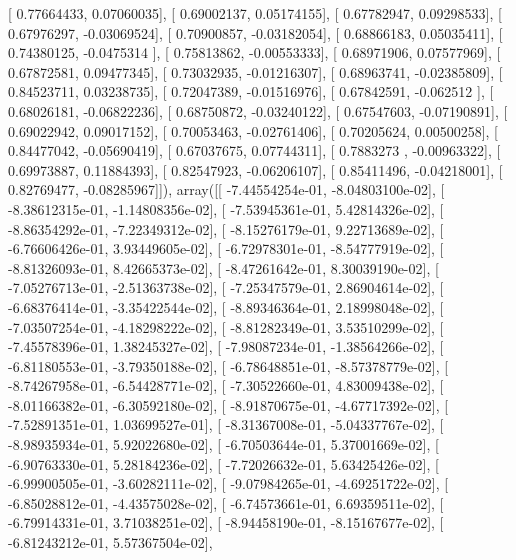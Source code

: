 \documentclass{article}
\begin{document}
       [ 0.77664433,  0.07060035],
       [ 0.69002137,  0.05174155],
       [ 0.67782947,  0.09298533],
       [ 0.67976297, -0.03069524],
       [ 0.70900857, -0.03182054],
       [ 0.68866183,  0.05035411],
       [ 0.74380125, -0.0475314 ],
       [ 0.75813862, -0.00553333],
       [ 0.68971906,  0.07577969],
       [ 0.67872581,  0.09477345],
       [ 0.73032935, -0.01216307],
       [ 0.68963741, -0.02385809],
       [ 0.84523711,  0.03238735],
       [ 0.72047389, -0.01516976],
       [ 0.67842591, -0.062512  ],
       [ 0.68026181, -0.06822236],
       [ 0.68750872, -0.03240122],
       [ 0.67547603, -0.07190891],
       [ 0.69022942,  0.09017152],
       [ 0.70053463, -0.02761406],
       [ 0.70205624,  0.00500258],
       [ 0.84477042, -0.05690419],
       [ 0.67037675,  0.07744311],
       [ 0.7883273 , -0.00963322],
       [ 0.69973887,  0.11884393],
       [ 0.82547923, -0.06206107],
       [ 0.85411496, -0.04218001],
       [ 0.82769477, -0.08285967]]), array([[ -7.44554254e-01,  -8.04803100e-02],
       [ -8.38612315e-01,  -1.14808356e-02],
       [ -7.53945361e-01,   5.42814326e-02],
       [ -8.86354292e-01,  -7.22349312e-02],
       [ -8.15276179e-01,   9.22713689e-02],
       [ -6.76606426e-01,   3.93449605e-02],
       [ -6.72978301e-01,  -8.54777919e-02],
       [ -8.81326093e-01,   8.42665373e-02],
       [ -8.47261642e-01,   8.30039190e-02],
       [ -7.05276713e-01,  -2.51363738e-02],
       [ -7.25347579e-01,   2.86904614e-02],
       [ -6.68376414e-01,  -3.35422544e-02],
       [ -8.89346364e-01,   2.18998048e-02],
       [ -7.03507254e-01,  -4.18298222e-02],
       [ -8.81282349e-01,   3.53510299e-02],
       [ -7.45578396e-01,   1.38245327e-02],
       [ -7.98087234e-01,  -1.38564266e-02],
       [ -6.81180553e-01,  -3.79350188e-02],
       [ -6.78648851e-01,  -8.57378779e-02],
       [ -8.74267958e-01,  -6.54428771e-02],
       [ -7.30522660e-01,   4.83009438e-02],
       [ -8.01166382e-01,  -6.30592180e-02],
       [ -8.91870675e-01,  -4.67717392e-02],
       [ -7.52891351e-01,   1.03699527e-01],
       [ -8.31367008e-01,  -5.04337767e-02],
       [ -8.98935934e-01,   5.92022680e-02],
       [ -6.70503644e-01,   5.37001669e-02],
       [ -6.90763330e-01,   5.28184236e-02],
       [ -7.72026632e-01,   5.63425426e-02],
       [ -6.99900505e-01,  -3.60282111e-02],
       [ -9.07984265e-01,  -4.69251722e-02],
       [ -6.85028812e-01,  -4.43575028e-02],
       [ -6.74573661e-01,   6.69359511e-02],
       [ -6.79914331e-01,   3.71038251e-02],
       [ -8.94458190e-01,  -8.15167677e-02],
       [ -6.81243212e-01,   5.57367504e-02],
\end{document}
